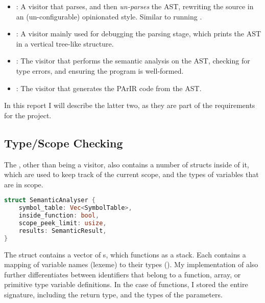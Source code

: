 \begin{itemize}
    \item {}: A visitor that parses, and then \textit{un-parses} the AST,
          rewriting the source in an (un-configurable) opinionated style. Similar to running .
    \item {}: A visitor mainly used for debugging the parsing
          stage, which prints the AST in a vertical tree-like structure.
    \item {}: The visitor that performs the semantic analysis
          on the AST, checking for type errors, and ensuring the program is well-formed.
    \item {}: The visitor that generates the PArIR code from the AST.
\end{itemize}

In this report I will describe the latter two, as they are part of the
requirements for the project.

\newpage

\subsection{Type/Scope Checking}

The , other than being a visitor, also contains a number
of structs inside of it, which are used to keep track of the current scope, and
the types of variables that are in scope.

\begin{mainbox}{}
    \lstset{xleftmargin=3.5cm, aboveskip=0pt, belowskip=0pt}
    \begin{lstlisting}[language=Rust]
struct SemanticAnalyser {
    symbol_table: Vec<SymbolTable>,
    inside_function: bool,
    scope_peek_limit: usize,
    results: SemanticResult,
}
\end{lstlisting}
\end{mainbox}

The  struct contains a vector of s,
which functions as a stack. Each  contains a mapping of
variable names (lexeme) to their types (). My implementation of
 also further differentiates between identifiers that belong to
a function, array, or primitive type variable definitions. In the case of
functions, I stored the entire signature, including the return type, and the
types of the parameters.

